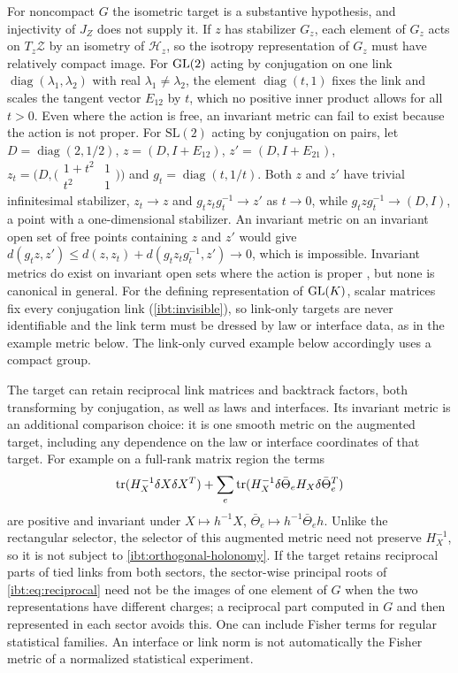 For noncompact $G$ the isometric target is a substantive hypothesis, and injectivity of $J_Z$ does not supply it. If $z$ has stabilizer $G_z$, each element of $G_z$ acts on $T_z\mathcal Z$ by an isometry of $\mathcal H_z$, so the isotropy representation of $G_z$ must have relatively compact image. For $\mathrm{GL}(2)$ acting by conjugation on one link $\operatorname{diag}(\lambda_1,\lambda_2)$ with real $\lambda_1\neq\lambda_2$, the element $\operatorname{diag}(t,1)$ fixes the link and scales the tangent vector $E_{12}$ by $t$, which no positive inner product allows for all $t>0$. Even where the action is free, an invariant metric can fail to exist because the action is not proper. For $\mathrm{SL}(2)$ acting by conjugation on pairs, let $D=\operatorname{diag}(2,1/2)$, $z=(D,I+E_{12})$, $z'=(D,I+E_{21})$, $z_t=\bigl(D,\bigl(\begin{smallmatrix}1+t^2&1\\t^2&1\end{smallmatrix}\bigr)\bigr)$ and $g_t=\operatorname{diag}(t,1/t)$. Both $z$ and $z'$ have trivial infinitesimal stabilizer, $z_t\to z$ and $g_tz_tg_t^{-1}\to z'$ as $t\to0$, while $g_tzg_t^{-1}\to(D,I)$, a point with a one-dimensional stabilizer. An invariant metric on an invariant open set of free points containing $z$ and $z'$ would give $d(g_tz,z')\leq d(z,z_t)+d(g_tz_tg_t^{-1},z')\to0$, which is impossible. Invariant metrics do exist on invariant open sets where the action is proper \citep{Palais1961}, but none is canonical in general. For the defining representation of $\mathrm{GL}(K)$, scalar matrices fix every conjugation link (\cref{ibt:invisible}), so link-only targets are never identifiable and the link term must be dressed by law or interface data, as in the example metric below. The link-only curved example below accordingly uses a compact group.

The target can retain reciprocal link matrices and backtrack factors, both transforming by conjugation, as well as laws and interfaces. Its invariant metric is an additional comparison choice: it is one smooth metric on the augmented target, including any dependence on the law or interface coordinates of that target. For example on a full-rank matrix region the terms
\begin{equation}
 \operatorname{tr}(H_X^{-1}\delta X\delta X^T)
 +\sum_e\operatorname{tr}(H_X^{-1}\delta\bar\Theta_e H_X\delta\bar\Theta_e^T)
\end{equation}
are positive and invariant under $X\mapsto h^{-1}X$, $\bar\Theta_e\mapsto h^{-1}\bar\Theta_eh$. Unlike the rectangular selector, the selector of this augmented metric need not preserve $H_X^{-1}$, so it is not subject to \cref{ibt:orthogonal-holonomy}. If the target retains reciprocal parts of tied links from both sectors, the sector-wise principal roots of \cref{ibt:eq:reciprocal} need not be the images of one element of $G$ when the two representations have different charges; a reciprocal part computed in $G$ and then represented in each sector avoids this. One can include Fisher terms for regular statistical families. An interface or link norm is not automatically the Fisher metric of a normalized statistical experiment.

